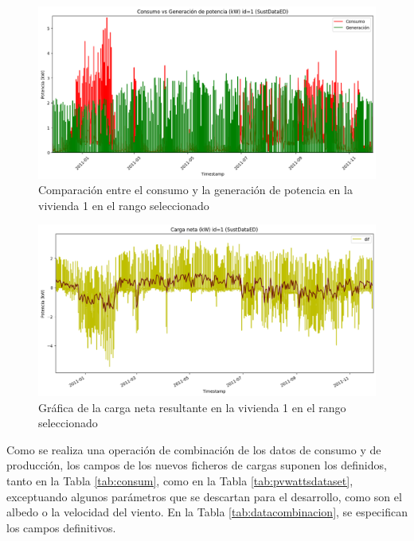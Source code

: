 \vspace{3mm}

\begin{figure}[H]
  \centering
  \includegraphics[width=1\textwidth]{img/diseno/calculocarga.png}
  \caption{Comparación entre el consumo y la generación de potencia en la vivienda 1 en el rango seleccionado}
  \label{fig:calculocarga}
\end{figure}

\begin{figure}[h!]
  \centering
  \includegraphics[width=1\textwidth]{img/diseno/calculocarga2.png}
  \caption{Gráfica de la carga neta resultante en la vivienda 1 en el rango seleccionado}
  \label{fig:calculocarga2}
\end{figure}

\vspace{3mm}

Como se realiza una operación de combinación de los datos de consumo y de producción, los campos de los nuevos ficheros de cargas suponen los definidos, tanto en la Tabla \ref{tab:consum}, como en la Tabla \ref{tab:pvwattsdataset}, exceptuando algunos parámetros que se descartan para el desarrollo, como son el albedo o la velocidad del viento. En la Tabla \ref{tab:datacombinacion}, se especifican los campos definitivos.

